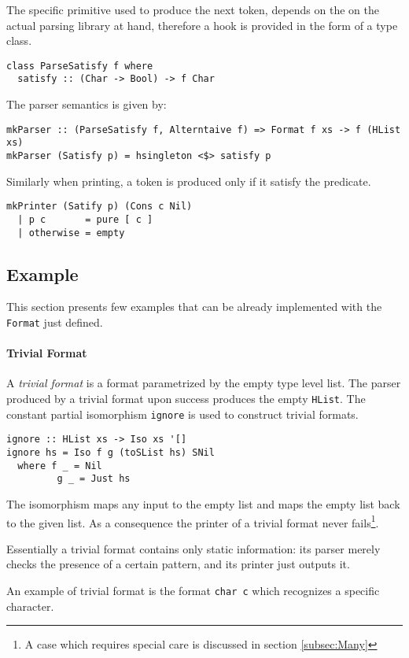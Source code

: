 \documentclass[../Thesis.tex]{subfiles}
\begin{document}
The specific primitive used to produce the next token, depends on the on the actual parsing library at hand, therefore a hook is provided in the form of a type class.

\begin{verbatim}
class ParseSatisfy f where
  satisfy :: (Char -> Bool) -> f Char
\end{verbatim}

The parser semantics is given by:
\begin{verbatim}
mkParser :: (ParseSatisfy f, Alterntaive f) => Format f xs -> f (HList xs)
mkParser (Satisfy p) = hsingleton <$> satisfy p
\end{verbatim} 

Similarly when printing, a token is produced only if it satisfy the predicate.
\begin{verbatim}
mkPrinter (Satify p) (Cons c Nil) 
  | p c       = pure [ c ]
  | otherwise = empty
\end{verbatim}

\subsection{Example}
This section presents few examples that can be already implemented with the \texttt{Format} just defined.

\paragraph{Trivial Format}
A \emph{trivial format }is a format parametrized by the empty type level list.
The parser produced by a trivial format upon success produces the empty \texttt{HList}. The constant partial isomorphism \texttt{ignore} is used to construct trivial formats.

\begin{verbatim}
ignore :: HList xs -> Iso xs '[]
ignore hs = Iso f g (toSList hs) SNil
  where f _ = Nil
         g _ = Just hs
\end{verbatim}
The isomorphism maps any input to the empty list and maps the empty list back to the given list. As a consequence the printer of a trivial format never fails\footnote{A case which requires special care is discussed in section \ref{subsec:Many}}.

Essentially a trivial format contains only static information: its
parser merely checks the presence of a certain pattern, and its printer
just outputs it.

An example of trivial format is the format \texttt{char c} which recognizes a specific character.
\end{document}
